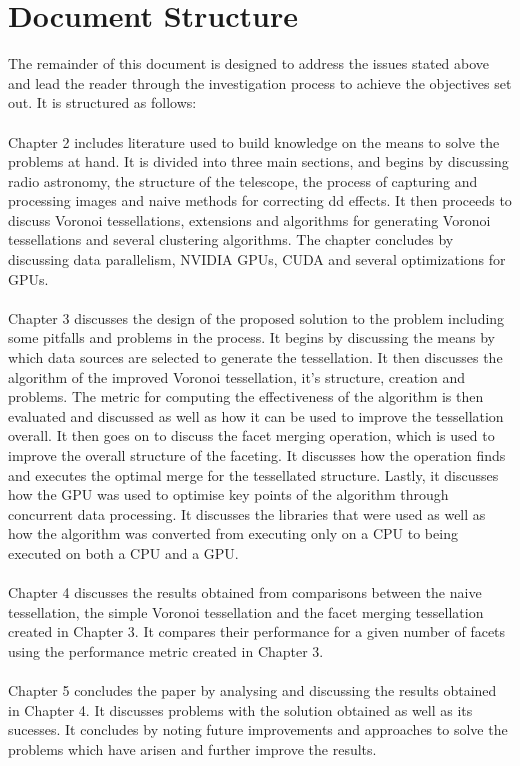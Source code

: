 \section{Document Structure}
The remainder of this document is designed to address the issues stated above and lead the reader through the investigation process to achieve the objectives set out. It is structured as follows:
\\
\\
Chapter 2 includes literature used to build knowledge on the means to solve the problems at hand. It is divided into three main sections, and begins by discussing radio astronomy, the structure of the telescope, the process of capturing and processing images and naive methods for correcting \gls{dd} effects. It then proceeds to discuss Voronoi tessellations, extensions and algorithms for generating Voronoi tessellations and several clustering algorithms. The chapter concludes by discussing data parallelism, NVIDIA GPUs, CUDA and several optimizations for GPUs.
\\
\\
Chapter 3 discusses the design of the proposed solution to the problem including some pitfalls and problems in the process. It begins by discussing the means by which data sources are selected to generate the tessellation. It then discusses the algorithm of the improved Voronoi tessellation, it's structure, creation and problems. The metric for computing the effectiveness of the algorithm is then evaluated and discussed as well as how it can be used to improve the tessellation overall. It then goes on to discuss the facet merging operation, which is used to improve the overall structure of the faceting. It discusses how the operation finds and executes the optimal merge for the tessellated structure. Lastly, it discusses how the GPU was used to optimise key points of the algorithm through concurrent data processing. It discusses the libraries that were used as well as how the algorithm was converted from executing only on a CPU to being executed on both a CPU and a GPU.
\\
\\
Chapter 4 discusses the results obtained from comparisons between the naive tessellation, the simple Voronoi tessellation and the facet merging tessellation created in Chapter 3. It compares their performance for a given number of facets using the performance metric created in Chapter 3.
\\
\\
Chapter 5 concludes the paper by analysing and discussing the results obtained in Chapter 4. It discusses problems with the solution obtained as well as its sucesses. It concludes by noting future improvements and approaches to solve the problems which have arisen and further improve the results.
